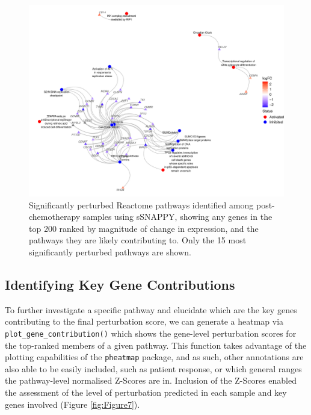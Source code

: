 \documentclass[9pt,a4paper,]{extarticle}
\begin{document}
\begin{figure}[h]

{\centering \includegraphics[width=1\linewidth]{sSNAPPY_paper_files/figure-latex/Figure6-1} 

}

\caption{Significantly perturbed Reactome pathways identified among post-chemotherapy samples using sSNAPPY, showing any genes in the top 200 ranked by magnitude of change in expression, and the pathways they are likely contributing to. Only the 15 most significantly perturbed pathways are shown.}\label{fig:Figure6}
\end{figure}

\hypertarget{identifying-key-gene-contributions}{%
\subsection{Identifying Key Gene Contributions}\label{identifying-key-gene-contributions}}

To further investigate a specific pathway and elucidate which are the key genes contributing to the final perturbation score, we can generate a heatmap via \texttt{plot\_gene\_contribution()} which shows the gene-level perturbation scores for the top-ranked members of a given pathway.
This function takes advantage of the plotting capabilities of the \texttt{pheatmap} package\citep{pheatmap}, and as such, other annotations are also able to be easily included, such as patient response, or which general ranges the pathway-level normalised Z-Scores are in.
Inclusion of the Z-Scores enabled the assessment of the level of perturbation predicted in each sample and key genes involved (Figure \ref{fig:Figure7}).
\end{document}

